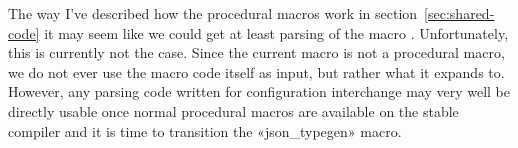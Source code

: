 The way I've described how the procedural macros work in section~\ref{sec:shared-code} it may seem like we could get at least parsing of the macro . Unfortunately, this is currently not the case. Since the current macro is not a procedural macro, we do not ever use the macro code itself as input, but rather what it expands to. However, any parsing code written for configuration interchange may very well be directly usable once normal procedural macros are available on the stable compiler and it is time to transition the «json_typegen» macro.



